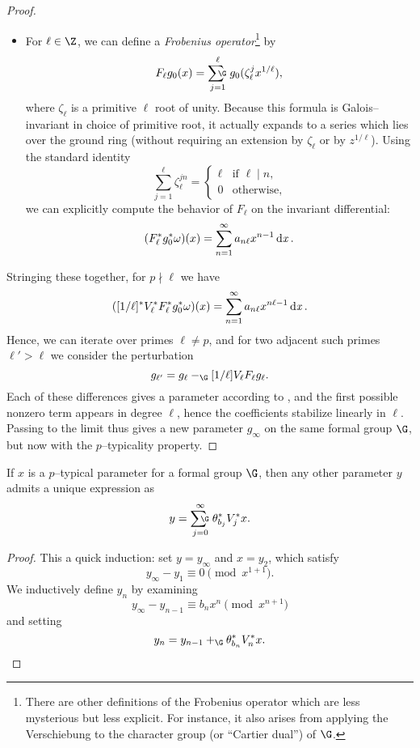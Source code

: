 \begin{proof}
\begin{itemize}
\item For \(\ell \in \Z\), we can define a \textit{Frobenius operator}\footnote{There are other definitions of the Frobenius operator which are less mysterious but less explicit.  For instance, it also arises from applying the Verschiebung to the character group (or ``Cartier dual'') of \(\G\).} by \[F_\ell g_0(x) = \sumG_{j=1}^\ell g_0(\zeta_\ell^j x^{1/\ell}),\] where \(\zeta_\ell\) is a primitive \(\ell\){\th} root of unity.  Because this formula is Galois--invariant in choice of primitive root, it actually expands to a series which lies over the ground ring (without requiring an extension by \(\zeta_\ell\) or by \(z^{1/\ell}\)).  Using the standard identity \[\sum_{j=1}^\ell \zeta_\ell^{jn} = \begin{cases}\ell & \text{if \(\ell \mid n\)}, \\ 0 & \text{otherwise}, \end{cases}\] we can explicitly compute the behavior of \(F_\ell\) on the invariant differential: \[(F_\ell^* g_0^* \omega)(x) = \sum_{n=1}^\infty a_{n \ell} x^{n-1} \operatorname{d\mathit{x}}.\]
\end{itemize}
Stringing these together, for \(p \nmid \ell\) we have \[([1/\ell]^* V_\ell^* F_\ell^* g_0^* \omega)(x) = \sum_{n=1}^\infty a_{n \ell} x^{n \ell - 1} \operatorname{d\mathit{x}}.\]  Hence, we can iterate over primes \(\ell \ne p\), and for two adjacent such primes \(\ell' > \ell\) we consider the perturbation \[g_{\ell'} = g_\ell -_{\G} [1/\ell] V_\ell F_\ell g_\ell.\]  Each of these differences gives a parameter according to , and the first possible nonzero term appears in degree \(\ell\), hence the coefficients stabilize linearly in \(\ell\).  Passing to the limit thus gives a new parameter \(g_\infty\) on the same formal group \(\G\), but now with the \(p\)--typicality property.
\end{proof}

\begin{lemma}
If \(x\) is a \(p\)--typical parameter for a formal group \(\G\), then any other parameter \(y\) admits a unique expression as \[y = \sumfgl{\G}_{j=0}^\infty \theta_{b_j}^* V_j^* x.\]
\end{lemma}
\begin{proof}
This a quick induction: set \(y = y_\infty\) and \(x = y_2\), which satisfy \[y_\infty - y_1 \equiv 0 \pmod{x^{1+1}}.\]  We inductively define \(y_n\) by examining \[y_\infty - y_{n-1} \equiv b_n x^n \pmod{x^{n+1}}\] and setting \[y_n = y_{n-1} +_{\G} \theta_{b_n}^* V_n^* x. \qedhere\]
\end{proof}

